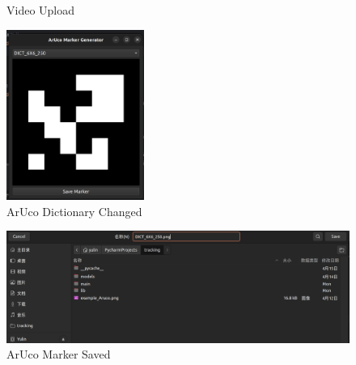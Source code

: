 \documentclass[12pt]{article}
\begin{document}
\begin{enumerate}
\begin{enumerate}
\begin{figure}[H]
                              \caption{Video Upload}
                        \end{figure}
                        \begin{figure}[H]
                              \centering
                              \includegraphics[width=0.4\textwidth]{change_aruco.png}
                              \caption{ArUco Dictionary Changed}
                        \end{figure}
                        \begin{figure}[H]
                              \centering
                              \includegraphics[width=1.2\textwidth]{save.png}
                              \caption{ArUco Marker Saved}
                        \end{figure}
            \end{enumerate}



\end{enumerate}
\end{document}
